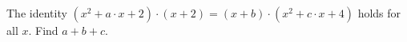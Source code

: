 The identity $(x^{2}+a \cdot x+2)\cdot(x+2)=(x+b)\cdot(x^{2}+c \cdot x+4)$ holds for all $x$. Find $a+b+c$.
